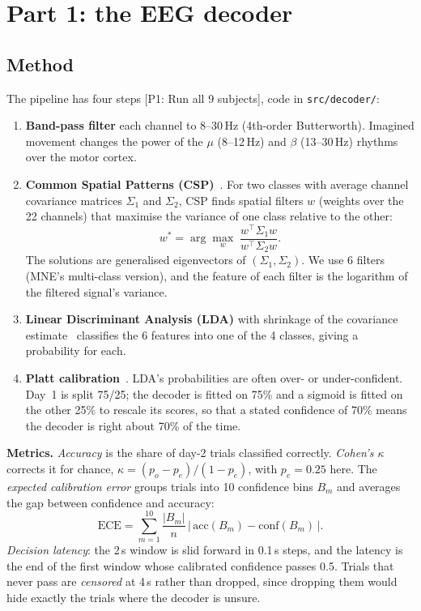 \documentclass[11pt,a4paper]{article}
\newcommand{\pone}[1]{{\small\textsf{[P1: #1]}}}
\newcommand{\code}[1]{\texttt{#1}}
\begin{document}
\section{Part 1: the EEG decoder}

\subsection{Method}
The pipeline has four steps \pone{Run all 9 subjects}, code in
\code{src/decoder/}:
\begin{enumerate}\setlength{\itemsep}{2pt}
\item \textbf{Band-pass filter} each channel to 8--30\,Hz (4th-order
Butterworth). Imagined movement changes the power of the $\mu$
(8--12\,Hz) and $\beta$ (13--30\,Hz) rhythms over the motor cortex.
\item \textbf{Common Spatial Patterns (CSP)}~\cite{ramoser2000csp}. For
two classes with average channel covariance matrices $\Sigma_1$ and
$\Sigma_2$, CSP finds spatial filters $w$ (weights over the 22 channels)
that maximise the variance of one class relative to the other:
\begin{equation}
w^{*} = \arg\max_{w}\; \frac{w^{\!\top}\Sigma_1 w}{w^{\!\top}\Sigma_2 w}.
\end{equation}
The solutions are generalised eigenvectors of $(\Sigma_1, \Sigma_2)$.
We use 6 filters (MNE's multi-class version), and the feature of each
filter is the logarithm of the filtered signal's variance.
\item \textbf{Linear Discriminant Analysis (LDA)} with shrinkage of the
covariance estimate~\cite{blankertz2011shrinkage} classifies the 6
features into one of the 4 classes, giving a probability for each.
\item \textbf{Platt calibration}~\cite{platt1999sigmoid}. LDA's
probabilities are often over- or under-confident. Day~1 is split 75/25;
the decoder is fitted on 75\% and a sigmoid is fitted on the other 25\%
to rescale its scores, so that a stated confidence of 70\% means the
decoder is right about 70\% of the time.
\end{enumerate}

\textbf{Metrics.} \emph{Accuracy} is the share of day-2 trials classified
correctly. \emph{Cohen's $\kappa$} corrects it for chance,
$\kappa = (p_o - p_e)/(1 - p_e)$, with $p_e = 0.25$ here. The
\emph{expected calibration error} groups trials into 10 confidence bins
$B_m$ and averages the gap between confidence and accuracy:
\begin{equation}
\mathrm{ECE} = \sum_{m=1}^{10} \frac{|B_m|}{n}\,
\bigl|\,\mathrm{acc}(B_m) - \mathrm{conf}(B_m)\,\bigr| .
\end{equation}
\emph{Decision latency}: the 2\,s window is slid forward in 0.1\,s steps,
and the latency is the end of the first window whose calibrated
confidence passes 0.5. Trials that never pass are \emph{censored} at
4\,s rather than dropped, since dropping them would hide exactly the
trials where the decoder is unsure.
\end{document}
